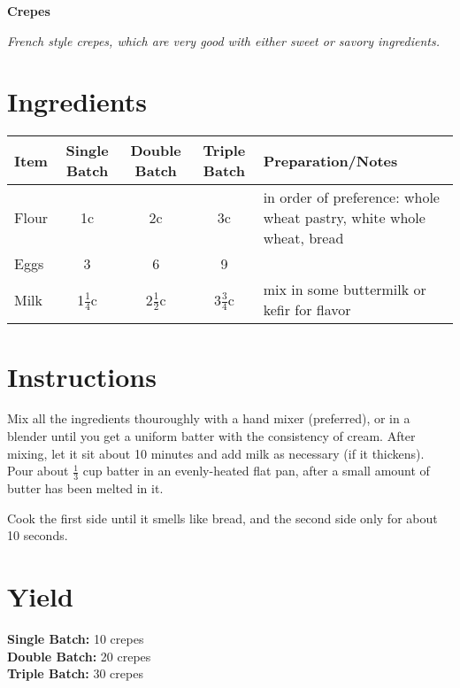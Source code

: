 \documentclass{/home/luke/Reference/Code/Source/latex-python/usr/local/lib/latex_python/recipes/examples/crepes}
\begin{document}
    \begin{center}
        {\Large \textbf{Crepes}}
        
        \small\textit{French style crepes, which are very good with either sweet or savory ingredients.}
    \end{center}
    
    \section*{Ingredients}
    \begin{center}
        
            \begin{tabular}{l c c c l}
                \textbf{Item} & \textbf{Single Batch} & \textbf{Double Batch} & \textbf{Triple Batch} & \textbf{Preparation/Notes} \\
                \hline
                Flour & 1c & 2c & 3c & \parbox[t]{0.4\textwidth}{in order of preference: whole wheat pastry, white whole wheat, bread} \\
Eggs & 3 & 6 & 9 & \parbox[t]{0.4\textwidth}{} \\
Milk & 1$\frac{1}{4}$c & 2$\frac{1}{2}$c & 3$\frac{3}{4}$c & \parbox[t]{0.4\textwidth}{mix in some buttermilk or kefir for flavor}
            \end{tabular}
        
    \end{center}
    
    \section*{Instructions}
    Mix all the ingredients thouroughly with a hand mixer (preferred), or in a blender
    until you get a uniform batter with the consistency of cream. After mixing,
    let it sit about 10 minutes and add milk as necessary (if it thickens).
    Pour about $\frac{1}{3}$ cup batter in an evenly-heated flat pan, after a small amount of
    butter has been melted in it.

    Cook the first side until it smells like bread,
    and the second side only for about 10 seconds.
    
    \section*{Yield}
    \textbf{Single Batch:} 10 crepes \\
\textbf{Double Batch:} 20 crepes \\
\textbf{Triple Batch:} 30 crepes
\end{document}
